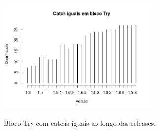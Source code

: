	\begin{figure}[h]
		\center
		\includegraphics[width=0.7\textwidth]{Imagens/catchsIguais}
		\label{fig:catchIguais}
		\caption{Bloco Try com catchs iguais ao longo das releases.}
	\end{figure}
